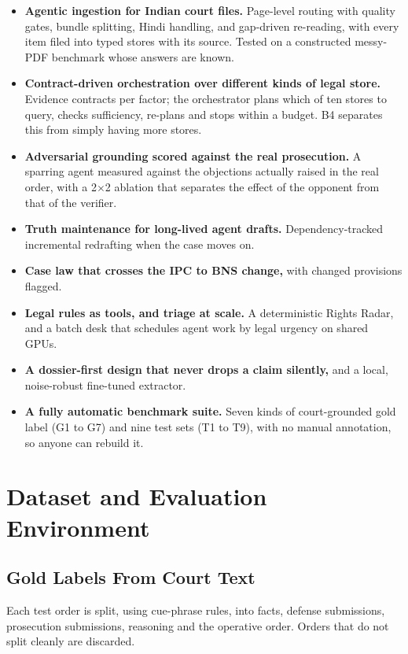 \documentclass[10pt,a4paper]{article}
\begin{document}
\begin{itemize}
\item \textbf{Agentic ingestion for Indian court files.} Page-level routing with quality gates, bundle splitting, Hindi handling, and gap-driven re-reading, with every item filed into typed stores with its source. Tested on a constructed messy-PDF benchmark whose answers are known.
\item \textbf{Contract-driven orchestration over different kinds of legal store.} Evidence contracts per factor; the orchestrator plans which of ten stores to query, checks sufficiency, re-plans and stops within a budget. B4 separates this from simply having more stores.
\item \textbf{Adversarial grounding scored against the real prosecution.} A sparring agent measured against the objections actually raised in the real order, with a 2$\times$2 ablation that separates the effect of the opponent from that of the verifier.
\item \textbf{Truth maintenance for long-lived agent drafts.} Dependency-tracked incremental redrafting when the case moves on.
\item \textbf{Case law that crosses the IPC to BNS change,} with changed provisions flagged.
\item \textbf{Legal rules as tools, and triage at scale.} A deterministic Rights Radar, and a batch desk that schedules agent work by legal urgency on shared GPUs.
\item \textbf{A dossier-first design that never drops a claim silently,} and a local, noise-robust fine-tuned extractor.
\item \textbf{A fully automatic benchmark suite.} Seven kinds of court-grounded gold label (G1 to G7) and nine test sets (T1 to T9), with no manual annotation, so anyone can rebuild it.
\end{itemize}

\section{Dataset and Evaluation Environment}

\subsection{Gold Labels From Court Text}

Each test order is split, using cue-phrase rules, into facts, defense submissions, prosecution submissions, reasoning and the operative order. Orders that do not split cleanly are discarded.
\end{document}
